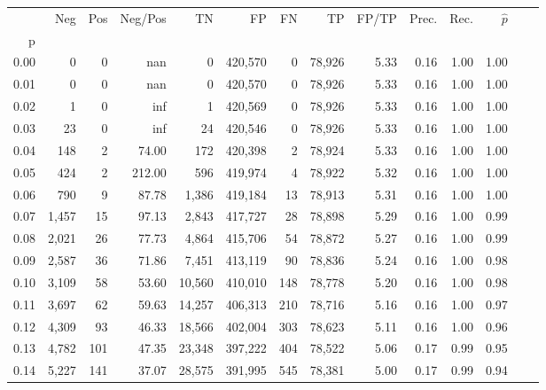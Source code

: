 \begin{tabular}{rrrrrrrrrrrrrr}
\toprule
{} &    Neg &    Pos & Neg/Pos &       TN &       FP &      FN &      TP & FP/TP & Prec. &  Rec. & $\hat{p}$ \\
p    &        &        &         &          &          &         &         &       &       &       &           \\
\midrule
0.00 &      0 &      0 &     nan &        0 &  420,570 &       0 &  78,926 &  5.33 &  0.16 &  1.00 &      1.00 \\
0.01 &      0 &      0 &     nan &        0 &  420,570 &       0 &  78,926 &  5.33 &  0.16 &  1.00 &      1.00 \\
0.02 &      1 &      0 &     inf &        1 &  420,569 &       0 &  78,926 &  5.33 &  0.16 &  1.00 &      1.00 \\
0.03 &     23 &      0 &     inf &       24 &  420,546 &       0 &  78,926 &  5.33 &  0.16 &  1.00 &      1.00 \\
0.04 &    148 &      2 &   74.00 &      172 &  420,398 &       2 &  78,924 &  5.33 &  0.16 &  1.00 &      1.00 \\
0.05 &    424 &      2 &  212.00 &      596 &  419,974 &       4 &  78,922 &  5.32 &  0.16 &  1.00 &      1.00 \\
0.06 &    790 &      9 &   87.78 &    1,386 &  419,184 &      13 &  78,913 &  5.31 &  0.16 &  1.00 &      1.00 \\
0.07 &  1,457 &     15 &   97.13 &    2,843 &  417,727 &      28 &  78,898 &  5.29 &  0.16 &  1.00 &      0.99 \\
0.08 &  2,021 &     26 &   77.73 &    4,864 &  415,706 &      54 &  78,872 &  5.27 &  0.16 &  1.00 &      0.99 \\
0.09 &  2,587 &     36 &   71.86 &    7,451 &  413,119 &      90 &  78,836 &  5.24 &  0.16 &  1.00 &      0.98 \\
0.10 &  3,109 &     58 &   53.60 &   10,560 &  410,010 &     148 &  78,778 &  5.20 &  0.16 &  1.00 &      0.98 \\
0.11 &  3,697 &     62 &   59.63 &   14,257 &  406,313 &     210 &  78,716 &  5.16 &  0.16 &  1.00 &      0.97 \\
0.12 &  4,309 &     93 &   46.33 &   18,566 &  402,004 &     303 &  78,623 &  5.11 &  0.16 &  1.00 &      0.96 \\
0.13 &  4,782 &    101 &   47.35 &   23,348 &  397,222 &     404 &  78,522 &  5.06 &  0.17 &  0.99 &      0.95 \\
0.14 &  5,227 &    141 &   37.07 &   28,575 &  391,995 &     545 &  78,381 &  5.00 &  0.17 &  0.99 &      0.94 \\

\end{tabular}
